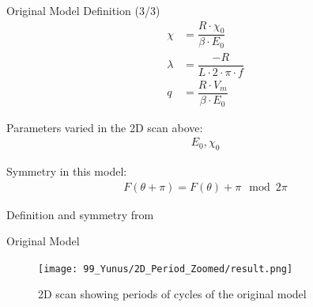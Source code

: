 \begin{frame}{Original Model Definition (3/3)}
    \vspace{-3.0em}
    \begin{align}
        \chi    & = \dfrac{R \cdot \chi_0}{\beta \cdot E_0} \\
        \lambda & = \dfrac{-R}{L \cdot 2 \cdot \pi \cdot f} \\
        q       & = \dfrac{R \cdot V_m}{\beta \cdot E_0}
    \end{align}

    Parameters varied in the 2D scan above:
    \begin{align*}
        E_0, \chi_0
    \end{align*}

    Symmetry in this model:
    \begin{align}
        F(\theta + \pi) = F(\theta) + \pi \mod 2 \pi
    \end{align}

    \begin{flushright}
        Definition and symmetry from \cite{akyuz2022}
    \end{flushright}
\end{frame}

\begin{frame}{Original Model}
    \begin{figure}
        \centering
        \texttt{[image: 99\_Yunus/2D\_Period\_Zoomed/result.png]}
        \caption{2D scan showing periods of cycles of the original model}
    \end{figure}
\end{frame}

